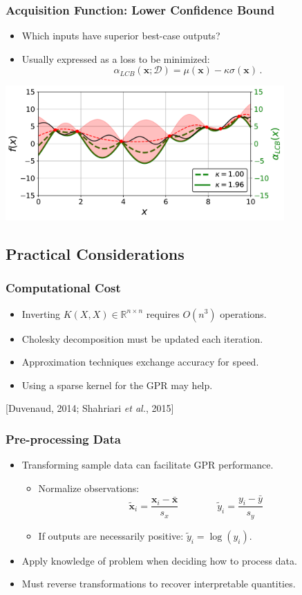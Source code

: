 \documentclass{beamer}
\newcommand{\R}{\mathbb{R}}
\newcommand{\vect}[1]{\boldsymbol{#1}}
\newcommand{\citeAY}[1]{
	\begin{flushright}
		{\footnotesize [#1]}
	\end{flushright}
}
\begin{document}
	\begin{frame}
		\frametitle{Acquisition Function: Lower Confidence Bound}
		\begin{itemize}
			\item Which inputs have superior best-case outputs?
			\item Usually expressed as a loss to be minimized: $$\alpha_{LCB}(\vect{x};\mathcal{D})=\mu(\vect{x})-\kappa\sigma(\vect{x})\,.$$
		\end{itemize}
		\begin{center}
			\includegraphics[width=0.8\textwidth]{figures/08c_LCB.pdf}
		\end{center}
	\end{frame}
	
	\subsection{Practical Considerations}
	\begin{frame}
		\frametitle{Computational Cost}
		\begin{itemize}
			\item Inverting $K(X,X)\in\R^{n\times n}$ requires $O(n^3)$ operations.
			\item Cholesky decomposition must be updated each iteration.
			\item Approximation techniques exchange accuracy for speed.
			\item Using a sparse kernel for the GPR may help.
		\end{itemize}
		\citeAY{Duvenaud, 2014; Shahriari \emph{et al.}, 2015}
	\end{frame}
	
	\begin{frame}
		\frametitle{Pre-processing Data}
		\begin{itemize}
			\item Transforming sample data can facilitate GPR performance.
			\begin{itemize}
				\item Normalize observations: $$\tilde{\vect{x}}_i=\frac{\vect{x}_i-\bar{\vect{x}}}{s_x}\qquad\qquad\tilde{y}_i=\frac{y_i-\bar{y}}{s_y}$$
				\item If outputs are necessarily positive: $\tilde{y}_i=\log(y_i)$.
			\end{itemize}
			\item Apply knowledge of problem when deciding how to process data.
			\item Must reverse transformations to recover interpretable quantities.
		\end{itemize}
	\end{frame}
\end{document}
